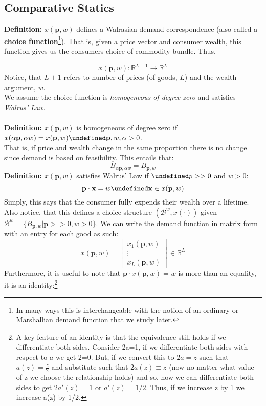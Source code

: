 \documentclass[12pt]{article}
\newcommand{\R}{\mathbb{R}}
\let\oldforall\forall
\let\forall\undefined
\let\bf\oldbf
\let\bf\textbf
\DeclareMathOperator{\forall}{\,\oldforall\,}
\begin{document}
\subsection{Comparative Statics}
\bf{Definition:} $x(\bf{p}, w)$ defines a Walrasian demand correspondence (also called a \bf{choice function}\footnote{In many ways this is interchangeable with the notion of an ordinary or Marshallian demand function that we study later.}). That is, given a price vector and consumer wealth, this function gives us the consumers choice of commodity bundle. Thus,

$$x(\bf{p}, w): \R^{L+1}\rightarrow\R^L$$
Notice, that $L + 1$ refers to number of prices (of goods, $L$) and the wealth argument, $w$.
\vspace{10pt}
\\ We assume the choice function is \emph{homogeneous of degree zero} and satisfies \emph{Walrus' Law}.
\\ \bf{\\Definition:} $x(\bf{p}, w)$ is homogeneous of degree zero if $x(\alpha\bf{p}, \alpha w) = x(\bf{p}, w) \forall \bf{p}, w, \alpha > 0$.
\\ That is, if price and wealth change in the same proportion there is no change since demand is based on feasibility. This entails that:
$$B_{\alpha\bf{p}, \alpha w} = B_{\bf{p}, w}$$
\bf{Definition:} $x(\bf{p}, w)$ satisfies Walrus' Law if $\forall p >> 0 $ and $w > 0$:
$$\bf{p}\cdot\bf{x} = w \forall \bf{x} \in x(\bf{p}, w)$$
Simply, this says that the consumer fully expends their wealth over a lifetime. 
\\ Also notice, that this defines a choice structure $(\mathcal{B}^w, x(\cdot))$ given $\mathcal{B}^w = \{B_{\bf{p}, w} | \bf{p} >> 0, w > 0 \}$.
We can write the demand function in matrix form with an entry for each good as such:
$$x(\bf{p}, w) = \begin{bmatrix} 
x_1(\bf{p}, w) \\
\vdots \\
x_L(\bf{p}, w) 
\end{bmatrix} \in \R^L$$
Furthermore, it is useful to note that $\bf{p}\cdot x(\bf{p}, w) = w$ is more than an equality, it is an identity:\footnote{A key feature of an identity is that the equivalence still holds if we differentiate both sides. Consider 2a=1, if we differentiate both sides with respect to $a$ we get 2=0. But, if we convert this to $2a=z$ such that $a(z) =\frac{z}{2}$ and substitute such that $2a(z) \equiv z$ (now no matter what value of z we choose the relationship holds) and so, now we can differentiate both sides to get $2a'(z) = 1$ or $a'(z) = 1/2$. Thus, if we increase z by 1 we increase a(z) by 1/2.}
\end{document}
